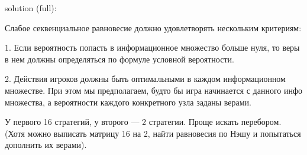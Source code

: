 \begin{problem}
\begin{sol}
solution (full): \par
Слабое секвенциальное равновесие должно удовлетворять нескольким критериям: \par
1. Если вероятность попасть в информационное множество больше нуля, то веры в нем должны определяться по формуле условной вероятности. \par
2. Действия игроков должны быть оптимальными в каждом информационном множестве. При этом мы предполагаем, будто бы игра начинается с данного инфо множества, а вероятности каждого конкретного узла заданы верами.\par

У первого 16 стратегий, у второго — 2 стратегии. Проще искать перебором. (Хотя можно выписать матрицу 16 на 2, найти равновесия по Нэшу и попытаться дополнить их верами).\par


\end{sol}
\end{problem}
